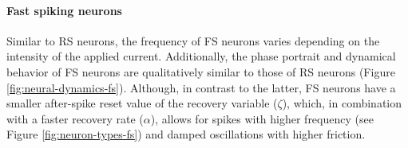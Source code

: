\paragraph{Fast spiking neurons}

Similar to RS neurons, the frequency of FS neurons varies depending on the intensity of the applied current. Additionally, the phase portrait and dynamical behavior of FS neurons are qualitatively similar to those of RS neurons (Figure \ref{fig:neural-dynamics-fs}). Although, in contrast to the latter, FS neurons have a smaller after-spike reset value of the recovery variable ($\zeta$), which, in combination with a faster recovery rate ($\alpha$), allows for spikes with higher frequency (see Figure \ref{fig:neuron-types-fs}) and damped oscillations with higher friction.